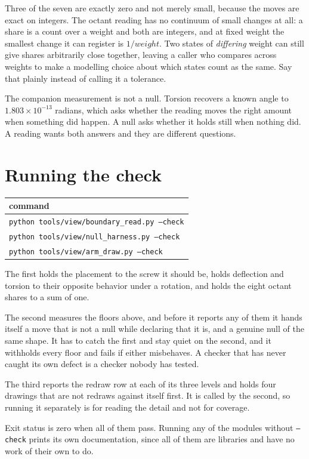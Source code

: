 Three of the seven are exactly zero and not merely small, because the moves are exact on integers. The octant reading has no continuum of small changes at all: a share is a count over a weight and both are integers, and at fixed weight the smallest change it can register is \(1/\mathit{weight}\). Two states of \emph{differing} weight can still give shares arbitrarily close together, leaving a caller who compares across weights to make a modelling choice about which states count as the same. Say that plainly instead of calling it a tolerance.

The companion measurement is not a null. Torsion recovers a known angle to \(1.803 \times 10^{-13}\) radians, which asks whether the reading moves the right amount when something did happen. A null asks whether it holds still when nothing did. A reading wants both answers and they are different questions.

\section{Running the check}

\begin{center}
\begin{tabular}{@{}l@{}}
\toprule
command \\
\midrule
\texttt{python tools/view/boundary\_read.py --check} \\
\texttt{python tools/view/null\_harness.py --check} \\
\texttt{python tools/view/arm\_draw.py --check} \\
\bottomrule
\end{tabular}
\end{center}

The first holds the placement to the screw it should be, holds deflection and torsion to their opposite behavior under a rotation, and holds the eight octant shares to a sum of one.

The second measures the floors above, and before it reports any of them it hands itself a move that is not a null while declaring that it is, and a genuine null of the same shape. It has to catch the first and stay quiet on the second, and it withholds every floor and fails if either misbehaves. A checker that has never caught its own defect is a checker nobody has tested.

The third reports the redraw row at each of its three levels and holds four drawings that are not redraws against itself first. It is called by the second, so running it separately is for reading the detail and not for coverage.

Exit status is zero when all of them pass. Running any of the modules without \texttt{--check} prints its own documentation, since all of them are libraries and have no work of their own to do.
